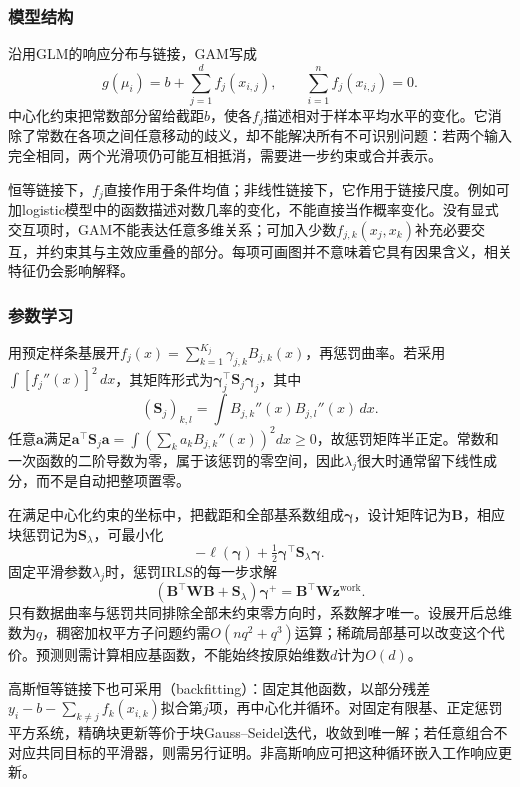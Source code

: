 \subsubsection{模型结构}

沿用GLM的响应分布与链接，GAM写成
\begin{equation}
  g(\mu_i)=b+\sum_{j=1}^{d}f_j(x_{i,j}),
  \qquad \sum_{i=1}^{n}f_j(x_{i,j})=0.
  \label{eq:regression-gam}
\end{equation}
中心化约束把常数部分留给截距$b$，使各$f_j$描述相对于样本平均水平的变化。它消除了常数在各项之间任意移动的歧义，却不能解决所有不可识别问题：若两个输入完全相同，两个光滑项仍可能互相抵消，需要进一步约束或合并表示。

恒等链接下，$f_j$直接作用于条件均值；非线性链接下，它作用于链接尺度。例如可加logistic模型中的函数描述对数几率的变化，不能直接当作概率变化。没有显式交互项时，GAM不能表达任意多维关系；可加入少数$f_{j,k}(x_j,x_k)$补充必要交互，并约束其与主效应重叠的部分。每项可画图并不意味着它具有因果含义，相关特征仍会影响解释。

\subsubsection{参数学习}

用预定样条基展开$f_j(x)=\sum_{k=1}^{K_j}\gamma_{j,k}B_{j,k}(x)$，再惩罚曲率。若采用$\int[f_j''(x)]^2\,dx$，其矩阵形式为$\bm{\gamma}_j^{\top}\bm{S}_j\bm{\gamma}_j$，其中
\[
  (\bm{S}_j)_{k,l}=\int B_{j,k}''(x)B_{j,l}''(x)\,dx.
\]
任意$\bm{a}$满足$\bm{a}^{\top}\bm{S}_j\bm{a}=\int(\sum_k a_kB_{j,k}''(x))^2dx\geq0$，故惩罚矩阵半正定。常数和一次函数的二阶导数为零，属于该惩罚的零空间，因此$\lambda_j$很大时通常留下线性成分，而不是自动把整项置零。

在满足中心化约束的坐标中，把截距和全部基系数组成$\bm{\gamma}$，设计矩阵记为$\bm{B}$，相应块惩罚记为$\bm{S}_{\lambda}$，可最小化
\[
  -\ell(\bm{\gamma})+\tfrac12\bm{\gamma}^{\top}
       \bm{S}_{\lambda}\bm{\gamma}.
\]
固定平滑参数$\lambda_j$时，惩罚IRLS的每一步求解
\begin{equation}
  (\bm{B}^{\top}\bm{W}\bm{B}+\bm{S}_{\lambda})
       \bm{\gamma}^{+}
  =\bm{B}^{\top}\bm{W}\bm{z}^{\mathrm{work}}.
  \label{eq:regression-gam-irls}
\end{equation}
只有数据曲率与惩罚共同排除全部未约束零方向时，系数解才唯一。设展开后总维数为$q$，稠密加权平方子问题约需$O(nq^2+q^3)$运算；稀疏局部基可以改变这个代价。预测则需计算相应基函数，不能始终按原始维数$d$计为$O(d)$。

高斯恒等链接下也可采用（backfitting）：固定其他函数，以部分残差$y_i-b-\sum_{k\ne j}f_k(x_{i,k})$拟合第$j$项，再中心化并循环。对固定有限基、正定惩罚平方系统，精确块更新等价于块Gauss--Seidel迭代，收敛到唯一解；若任意组合不对应共同目标的平滑器，则需另行证明。非高斯响应可把这种循环嵌入工作响应更新。

